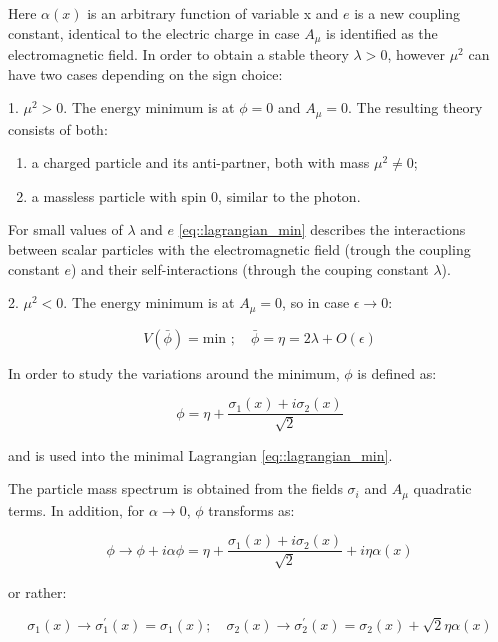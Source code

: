 Here $\alpha(x)$ is an arbitrary function of variable x and $e$ is a new coupling constant, identical to the electric charge in case $A_{\mu}$ is identified as the electromagnetic field. In order to obtain a stable theory $\lambda > 0$, however $\mu^{2}$ can have two cases depending on the sign choice:
 
1. $\mu^{2} > 0$. The energy minimum is at $\phi = 0$ and $A_{\mu} = 0$. The resulting theory consists of both:

\begin{enumerate}
	\item a charged particle and its anti-partner, both with mass $\mu^{2} \neq 0$;
	\item a massless particle with spin 0, similar to the photon.
\end{enumerate}

For small values of $\lambda$ and $e$ \autoref{eq::lagrangian_min} describes the interactions between scalar particles with the electromagnetic field (trough the coupling constant $e$) and their self-interactions (through the couping constant $\lambda$).

2. $\mu^{2} < 0$. The energy minimum is at $A_{\mu} = 0$, so in  case $\epsilon \rightarrow 0$:

\begin{equation}
V(\bar{\phi}) = \text{min }; \quad \bar{\phi}=\eta= 2\lambda +O(\epsilon)
\end{equation}
 
 In order to study the  variations around the minimum, $\phi$ is defined as:

\begin{equation}
 \phi=\eta + \dfrac{\sigma_{1}(x) + i\sigma_{2}(x)}{\sqrt{2}} 
\end{equation}

and is used into the minimal Lagrangian \ref{eq::lagrangian_min}.

The particle mass spectrum is obtained from the fields $\sigma_{i}$ and $A_{\mu}$ quadratic terms. In addition, for $\alpha \rightarrow 0$, $\phi$ transforms as:

\begin{equation}
\phi \rightarrow \phi + i\alpha\phi = \eta + \dfrac{\sigma_{1}(x) + i\sigma_{2}(x)}{\sqrt{2}} + i\eta\alpha(x)
\end{equation}

or rather:

\begin{equation}
\sigma_{1}(x) \rightarrow \sigma^{\prime}_{1}(x) = \sigma_{1}(x); \quad \sigma_{2}(x) \rightarrow \sigma^{\prime}_{2}(x) = \sigma_{2}(x) + \sqrt{2}\eta\alpha(x)
\end{equation}

